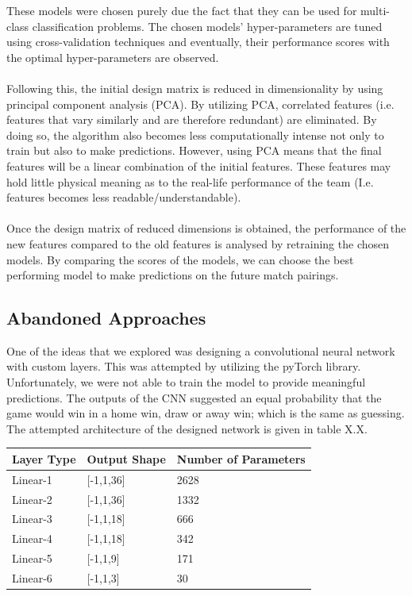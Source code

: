 \documentclass[a4paper,12pt]{article}
\begin{document}
	These models were chosen purely due the fact that they can be used for multi-class classification problems. The chosen models' hyper-parameters are tuned using cross-validation techniques and eventually, their performance scores with the optimal hyper-parameters are observed.\\
	\\
	Following this, the initial design matrix is reduced in dimensionality by using principal component analysis (PCA). By utilizing PCA, correlated features (i.e. features that vary similarly and are therefore redundant) are eliminated. By doing so, the algorithm also becomes less computationally intense not only to train but also to make predictions. However, using PCA means that the final features will be a linear combination of the initial features. These features may hold little physical meaning as to the real-life performance of the team (I.e. features becomes less readable/understandable).\\
	\\
	Once the design matrix of reduced dimensions is obtained, the performance of the new features compared to the old features is analysed by retraining the chosen models. By comparing the scores of the models, we can choose the best performing model to make predictions on the future match pairings. 
	\subsection{Abandoned Approaches}
	One of the ideas that we explored was designing a convolutional neural network with custom layers. This was attempted by utilizing the pyTorch library. Unfortunately, we were not able to train the model to provide meaningful predictions. The outputs of the CNN suggested an equal probability that the game would win in a home win, draw or away win; which is the same as guessing. The attempted architecture of the designed network is given in table X.X.
	
	\begin{table}[H]
		\centering
		\begin{tabular}{@{}lll@{}}
			\toprule
			Layer Type & Output Shape & Number of Parameters \\ \midrule
			Linear-1   & [-1,1,36]    & 2628                 \\
			Linear-2   & [-1,1,36]    & 1332                 \\
			Linear-3   & [-1,1,18]    & 666                  \\
			Linear-4   & [-1,1,18]    & 342                  \\
			Linear-5   & [-1,1,9]     & 171                  \\
			Linear-6   & [-1,1,3]     & 30                   \\ \bottomrule
		\end{tabular}
	\end{table}
	
\end{document}
